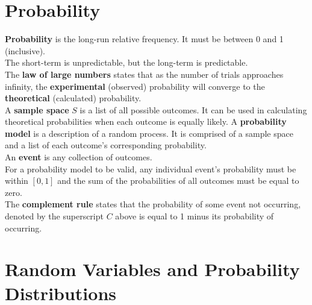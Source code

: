 \documentclass[../AP_Statistics.tex]{subfiles}
\begin{document}
	\chapter{Probability}
		\textbf{Probability} is the long-run relative frequency. It must be between 0 and 1 (inclusive). \\
		The short-term is unpredictable, but the long-term is predictable. \\
		The \textbf{law of large numbers} states that as the number of trials approaches infinity, the \textbf{experimental} (observed) probability will converge to the \textbf{theoretical} (calculated) probability. \\
		A \textbf{sample space} $S$ is a list of all possible outcomes. It can be used in calculating theoretical probabilities when each outcome is equally likely.
		A \textbf{probability model} is a description of a random process. It is comprised of a sample space and a list of each outcome's corresponding probability. \\
		An \textbf{event} is any collection of outcomes. \\
		For a probability model to be valid, any individual event's probability must be within $[0, 1]$ and the sum of the probabilities of all outcomes must be equal to zero. \\
		The \textbf{complement rule} states that the probability of some event not occurring, denoted by the superscript $C$ above  is equal to 1 minus its probability of occurring. \\
	\chapter{Random Variables and Probability Distributions}
\end{document}
